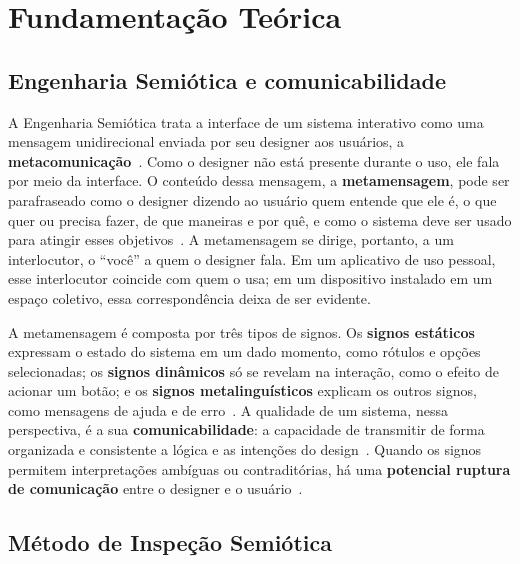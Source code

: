 \section{Fundamentação Teórica}
\label{sec:fundamentacao}

\subsection{Engenharia Semiótica e comunicabilidade}
\label{sec:engsem}

A Engenharia Semiótica trata a interface de um sistema interativo como
uma mensagem unidirecional enviada por seu designer aos usuários, a
\textbf{metacomunicação}~\cite{desouza2005semiotic}. Como o designer não
está presente durante o uso, ele fala por meio da interface. O conteúdo
dessa mensagem, a \textbf{metamensagem}, pode ser parafraseado como o
designer dizendo ao usuário quem entende que ele é, o que quer ou precisa
fazer, de que maneiras e por quê, e como o sistema deve ser usado para
atingir esses objetivos~\cite[p.~25]{desouza2005semiotic}. A metamensagem
se dirige, portanto, a um interlocutor, o ``você'' a quem o designer
fala. Em um aplicativo de uso pessoal, esse interlocutor coincide com
quem o usa; em um dispositivo instalado em um espaço coletivo, essa
correspondência deixa de ser evidente.

A metamensagem é composta por três tipos de signos. Os \textbf{signos
estáticos} expressam o estado do sistema em um dado momento, como rótulos
e opções selecionadas; os \textbf{signos dinâmicos} só se revelam na
interação, como o efeito de acionar um botão; e os \textbf{signos
metalinguísticos} explicam os outros signos, como mensagens de ajuda e de
erro~\cite{desouza2006sim,fortunato2025ihc}. A qualidade de um sistema,
nessa perspectiva, é a sua \textbf{comunicabilidade}: a capacidade de
transmitir de forma organizada e consistente a lógica e as intenções do
design~\cite{desouza2009methods}. Quando os signos permitem
interpretações ambíguas ou contraditórias, há uma \textbf{potencial
ruptura de comunicação} entre o designer e o
usuário~\cite{desouza2006sim}.

\subsection{Método de Inspeção Semiótica}
\label{sec:mis}

